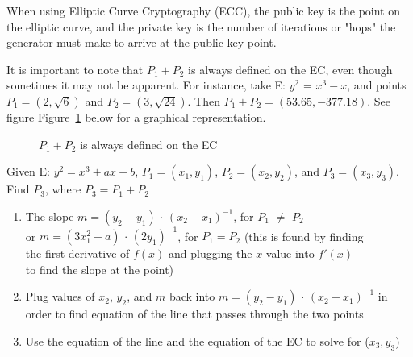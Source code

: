 When using Elliptic Curve Cryptography (ECC), the public key is the point on the elliptic curve, and the private key is the number of iterations or "hops" the generator must make to arrive at the public key point.  

It is important to note that $P_1 + P_2$ is always defined on the EC, even though sometimes it may not be apparent.  For instance, take E: $ y^2$ = $x^3 - x$, and points $P_1 = (2, \sqrt{6})$ and $P_2 = (3, \sqrt{24})$.  Then $P_1 + P_2 = (53.65,-377.18)$. See figure Figure~\ref{fig:DH:DHKE_16} below for a graphical representation.
\begin{figure}[H]
	  \caption{\label{fig:DH:DHKE_16} $P_1 + P_2$ is always defined on the EC}
\end{figure}
Given E: $y^2 = x^3 + ax + b$, $P_1 = (x_1, y_1)$, $P_2 = (x_2, y_2)$, and $P_3 = (x_3, y_3)$. Find $P_3$, where $ P_3 =  P_1 + P_2$
\begin{enumerate}[(1)] 
	\item The slope $m =(y_2 - y_1)$ $\cdot$ $(x_2- x_1)^{-1}$, for $P_1$ $\neq$ $P_2$ \\
			\text{ \qquad \: \: \:}or $m = (3x_1^2 + a)$ $\cdot$ $(2y_1)^{-1}$, for $P_1 = P_2$ (this is found by finding\\
			\text{ \qquad \: \: \:}the first derivative of $f(x)$ and plugging the $x$ value into $f'(x)$ \\
			\text{ \qquad \: \: \:}to find the slope at the point)\\
	\item Plug values of $x_2$, $y_2$, and $m$ back into $m =(y_2 - y_1)$ $\cdot$ $(x_2- x_1)^{-1}$ in order to find equation of the line that passes through the two points \\
	\item Use the equation of the line and the equation of the EC to solve for ($x_3, y_3$)
\end {enumerate} 

